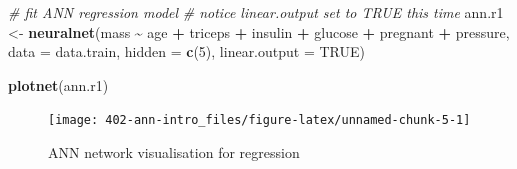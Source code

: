 \documentclass[
]{book}
\newenvironment{Shaded}{\begin{snugshade}}{\end{snugshade}}
\newcommand{\CommentTok}[1]{\textcolor[rgb]{0.56,0.35,0.01}{\textit{#1}}}
\newcommand{\DataTypeTok}[1]{\textcolor[rgb]{0.13,0.29,0.53}{#1}}
\newcommand{\DecValTok}[1]{\textcolor[rgb]{0.00,0.00,0.81}{#1}}
\newcommand{\KeywordTok}[1]{\textcolor[rgb]{0.13,0.29,0.53}{\textbf{#1}}}
\newcommand{\NormalTok}[1]{#1}
\newcommand{\OperatorTok}[1]{\textcolor[rgb]{0.81,0.36,0.00}{\textbf{#1}}}
\newcommand{\OtherTok}[1]{\textcolor[rgb]{0.56,0.35,0.01}{#1}}
\newcommand{\StringTok}[1]{\textcolor[rgb]{0.31,0.60,0.02}{#1}}
\theoremstyle{definition}
\theoremstyle{definition}
\theoremstyle{definition}
\theoremstyle{remark}
\begin{document}
\begin{Shaded}
\begin{Highlighting}[]
\CommentTok{\# fit ANN regression model}
\CommentTok{\# notice linear.output set to TRUE this time}
\NormalTok{ann.r1 \textless{}{-}}\StringTok{ }\KeywordTok{neuralnet}\NormalTok{(mass }\OperatorTok{\textasciitilde{}}\StringTok{  }\NormalTok{age }\OperatorTok{+}\StringTok{ }\NormalTok{triceps  }\OperatorTok{+}\StringTok{ }\NormalTok{insulin }\OperatorTok{+}\StringTok{ }\NormalTok{glucose }\OperatorTok{+}\StringTok{ }\NormalTok{pregnant }\OperatorTok{+}\StringTok{ }\NormalTok{pressure, }
                        \DataTypeTok{data =}\NormalTok{ data.train,}
                        \DataTypeTok{hidden =} \KeywordTok{c}\NormalTok{(}\DecValTok{5}\NormalTok{),}
                        \DataTypeTok{linear.output =} \OtherTok{TRUE}\NormalTok{)}

\KeywordTok{plotnet}\NormalTok{(ann.r1)}
\end{Highlighting}
\end{Shaded}

\begin{figure}

{\centering \texttt{[image: 402-ann-intro\_files/figure-latex/unnamed-chunk-5-1]} 

}

\caption{ANN network visualisation for regression}\label{fig:unnamed-chunk-5-1}
\end{figure}
\end{document}
